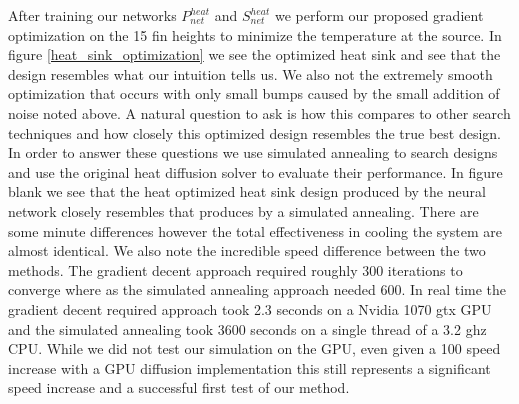 \documentclass{article} %
\begin{document}
After training our networks $P^{heat}_{net}$ and $S^{heat}_{net}$ we perform our proposed gradient optimization on the 15 fin heights to minimize the temperature at the source. In figure \ref{heat_sink_optimization} we see the optimized heat sink and see that the design resembles what our intuition tells us. We also not the extremely smooth optimization that occurs with only small bumps caused by the small addition of noise noted above. A natural question to ask is how this compares to other search techniques and how closely this optimized design resembles the true best design. In order to answer these questions we use simulated annealing to search designs and use the original heat diffusion solver to evaluate their performance. In figure blank we see that the heat optimized heat sink design produced by the neural network closely resembles that produces by a simulated annealing. There are some minute differences however the total effectiveness in cooling the system are almost identical. We also note the incredible speed difference between the two methods. The gradient decent approach required roughly 300 iterations to converge where as the simulated annealing approach needed 600. In real time the gradient decent required approach took 2.3 seconds on a Nvidia 1070 gtx GPU and the simulated annealing took 3600 seconds on a single thread of a 3.2 ghz CPU. While we did not test our simulation on the GPU, even given a 100 speed increase with a GPU diffusion implementation this still represents a significant speed increase and a successful first test of our method.
\end{document}
